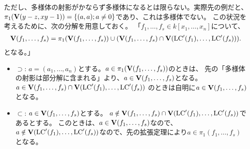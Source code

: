\documentclass[9pt]{ltjsarticle}
\begin{document}
ただし、多様体の射影がかならず多様体になるとは限らない。実際先の例だと、
$\pi_1(\textbf V(y-z,xy-1))= \left\{(a,a); a\neq 0\right\}$であり、これは多様体でない。
この状況を考えるために、次の分解を用意しておく。
「$f_1,\dots,f_s \in k[x_1,\dots,x_n]$について、
\begin{align}
  \textbf V(f_1,\dots,f_s)
  =
  \pi_1(\textbf V(f_1,\dots,f_s))
  \cup
  (\textbf V(f_1,\dots,f_s) \cap \textbf V({\rm LC}'(f_1),\dots,{\rm LC}'(f_s))).
\end{align}
となる。」
\begin{myproof}
  \begin{itemize}
    \item $\supset$:
    $a=(a_1,\dots,a_n)$とする。$a\in \pi_1(\textbf V(f_1,\dots,f_s))$のときは、
    先の「多様体の射影は部分解に含まれる」より、$a\in \textbf V(f_1,\dots,f_s)$となる。
    $a\in \textbf V(f_1,\dots,f_s)\cap \textbf V({\rm LC}'(f_1),\dots,{\rm LC}'(f_s))$
    のときは自明に$a\in \textbf V(f_1,\dots,f_s)$となる。
    \item $\subset$:
    $a\in \textbf V(f_1,\dots,f_s)$とする。
    $a\notin \textbf V(f_1,\dots,f_s)\cap \textbf V({\rm LC}'(f_1),\dots,{\rm LC}'(f_s))$であるとする。
    このときは、$a\in \textbf V(f_1,\dots,f_s)$なので、$a\notin \textbf V({\rm LC}'(f_1),\dots,{\rm LC}'(f_s))$なので、先の拡張定理により$a\in \pi_1(f_1,\dots,f_s)$となる。
  \end{itemize}
\end{myproof}
\end{document}
